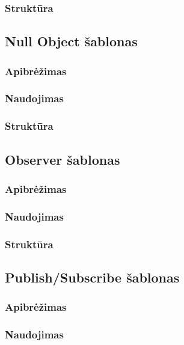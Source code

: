 \documentclass[10pt]{IEEEtran}
\begin{document}
			\subsubsection{Struktūra}

		\subsection{Null Object šablonas}

			\subsubsection{Apibrėžimas}

			\subsubsection{Naudojimas}

			\subsubsection{Struktūra}

		\subsection{Observer šablonas}

			\subsubsection{Apibrėžimas}

			\subsubsection{Naudojimas}

			\subsubsection{Struktūra}

		
		\subsection{Publish/Subscribe šablonas}

			\subsubsection{Apibrėžimas}

			\subsubsection{Naudojimas}
\end{document}
